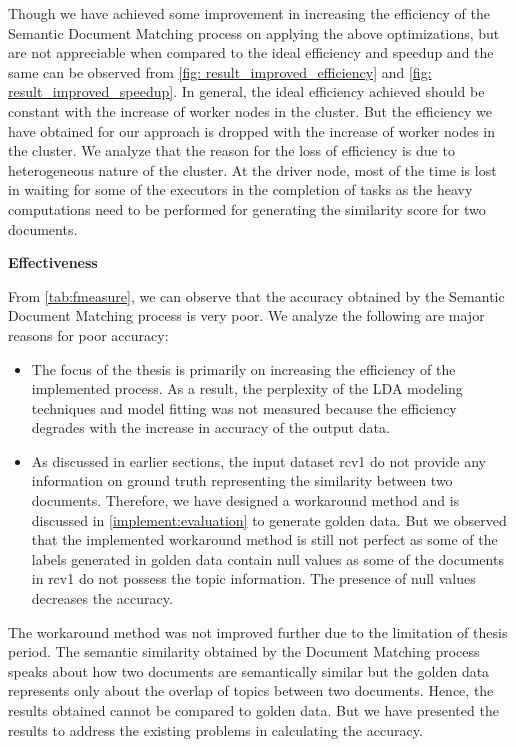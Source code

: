 \par Though we have achieved some improvement in increasing the efficiency of the Semantic Document Matching process on applying the above optimizations, but are not appreciable when compared to the ideal efficiency and speedup and the same can be observed from \ref{fig: result_improved_efficiency} and \ref{fig: result_improved_speedup}. In general, the ideal efficiency achieved should be constant with the increase of worker nodes in the cluster. But the efficiency we have obtained for our approach is dropped with the increase of worker nodes in the cluster. We analyze that the reason for the loss of efficiency is due to heterogeneous nature of the cluster. At the driver node, most of the time is lost in waiting for some of the executors in the completion of tasks as the heavy computations need to be performed for generating the similarity score for two documents.




\textbf{Effectiveness}

From \ref{tab:fmeasure}, we can observe that the accuracy obtained by the Semantic Document Matching process is very poor. We analyze the following are major reasons for poor accuracy:

\begin{itemize}
\item The focus of the thesis is primarily on increasing the efficiency of the implemented process. As a result, the perplexity of the LDA modeling techniques and model fitting was not measured because the efficiency degrades with the increase in accuracy of the output data.

\item As discussed in earlier sections, the input dataset rcv1 do not provide any information on ground truth representing the similarity between two documents. Therefore, we have designed a workaround method and is discussed in \ref{implement:evaluation} to generate golden data. But we observed that the implemented workaround method is still not perfect as some of the labels generated in golden data contain null values as some of the documents in rcv1 do not possess the topic information. The presence of null values decreases the accuracy.
\end{itemize}

\par The workaround method was not improved further due to the limitation of thesis period. The semantic similarity obtained by the Document Matching process speaks about how two documents are semantically similar but the golden data represents only about the overlap of topics between two documents. Hence, the results obtained cannot be compared to golden data. But we have presented the results to address the existing problems in calculating the accuracy.


